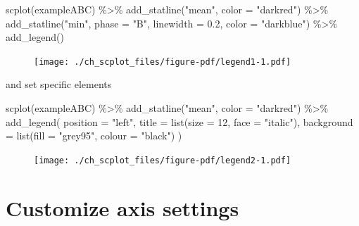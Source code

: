 \documentclass[
  letterpaper,
  DIV=11,
  numbers=noendperiod]{scrreprt}
\newenvironment{Shaded}{\begin{snugshade}}{\end{snugshade}}
\newcommand{\AttributeTok}[1]{\textcolor[rgb]{0.40,0.45,0.13}{#1}}
\newcommand{\DecValTok}[1]{\textcolor[rgb]{0.68,0.00,0.00}{#1}}
\newcommand{\FloatTok}[1]{\textcolor[rgb]{0.68,0.00,0.00}{#1}}
\newcommand{\FunctionTok}[1]{\textcolor[rgb]{0.28,0.35,0.67}{#1}}
\newcommand{\NormalTok}[1]{\textcolor[rgb]{0.00,0.23,0.31}{#1}}
\newcommand{\SpecialCharTok}[1]{\textcolor[rgb]{0.37,0.37,0.37}{#1}}
\newcommand{\StringTok}[1]{\textcolor[rgb]{0.13,0.47,0.30}{#1}}
\begin{document}
\begin{Shaded}
\begin{Highlighting}[]
\FunctionTok{scplot}\NormalTok{(exampleABC) }\SpecialCharTok{\%\textgreater{}\%}
  \FunctionTok{add\_statline}\NormalTok{(}\StringTok{"mean"}\NormalTok{, }\AttributeTok{color =} \StringTok{"darkred"}\NormalTok{) }\SpecialCharTok{\%\textgreater{}\%}
  \FunctionTok{add\_statline}\NormalTok{(}\StringTok{"min"}\NormalTok{, }\AttributeTok{phase =} \StringTok{"B"}\NormalTok{, }\AttributeTok{linewidth =} \FloatTok{0.2}\NormalTok{, }\AttributeTok{color =} \StringTok{"darkblue"}\NormalTok{) }\SpecialCharTok{\%\textgreater{}\%}
  \FunctionTok{add\_legend}\NormalTok{()}
\end{Highlighting}
\end{Shaded}

\begin{figure}[H]

{\centering \texttt{[image: ./ch\_scplot\_files/figure-pdf/legend1-1.pdf]}

}

\end{figure}

and set specific elements

\begin{Shaded}
\begin{Highlighting}[]
\FunctionTok{scplot}\NormalTok{(exampleABC) }\SpecialCharTok{\%\textgreater{}\%}
  \FunctionTok{add\_statline}\NormalTok{(}\StringTok{"mean"}\NormalTok{, }\AttributeTok{color =} \StringTok{"darkred"}\NormalTok{) }\SpecialCharTok{\%\textgreater{}\%}
  \FunctionTok{add\_legend}\NormalTok{(}
    \AttributeTok{position =} \StringTok{"left"}\NormalTok{, }
    \AttributeTok{title =} \FunctionTok{list}\NormalTok{(}\AttributeTok{size =} \DecValTok{12}\NormalTok{, }\AttributeTok{face =} \StringTok{"italic"}\NormalTok{),}
    \AttributeTok{background =} \FunctionTok{list}\NormalTok{(}\AttributeTok{fill =} \StringTok{"grey95"}\NormalTok{, }\AttributeTok{colour =} \StringTok{"black"}\NormalTok{)}
\NormalTok{  )}
\end{Highlighting}
\end{Shaded}

\begin{figure}[H]

{\centering \texttt{[image: ./ch\_scplot\_files/figure-pdf/legend2-1.pdf]}

}

\end{figure}

\hypertarget{customize-axis-settings}{%
\section{Customize axis settings}\label{customize-axis-settings}}
\end{document}
